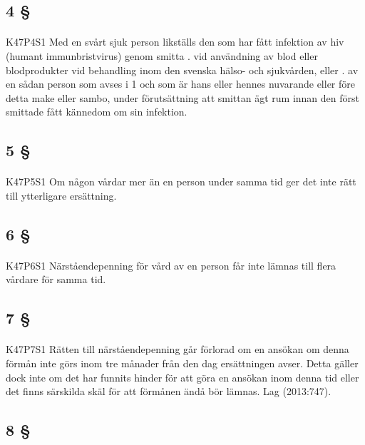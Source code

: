 \documentclass[a4paper,notitlepage,openany,10pt]{book}
\begin{document}
\subsection*{4 §}
\paragraph*{}
{\tiny K47P4S1}
Med en svårt sjuk person likställs den som har fått infektion av hiv (humant immunbristvirus) genom smitta
. vid användning av blod eller blodprodukter vid behandling inom den svenska hälso- och sjukvården, eller
. av en sådan person som avses i 1 och som är hans eller hennes nuvarande eller före detta make eller sambo, under förutsättning att smittan ägt rum innan den först smittade fått kännedom om sin infektion.
\subsection*{5 §}
\paragraph*{}
{\tiny K47P5S1}
Om någon vårdar mer än en person under samma tid ger det inte rätt till ytterligare ersättning.
\subsection*{6 §}
\paragraph*{}
{\tiny K47P6S1}
Närståendepenning för vård av en person får inte lämnas till flera vårdare för samma tid.
\subsection*{7 §}
\paragraph*{}
{\tiny K47P7S1}
Rätten till närståendepenning går förlorad om en ansökan om denna förmån inte görs inom tre månader från den dag ersättningen avser. Detta gäller dock inte om det har funnits hinder för att göra en ansökan inom denna tid eller det finns särskilda skäl för att förmånen ändå bör lämnas.
Lag (2013:747).
\subsection*{8 §}
\end{document}

